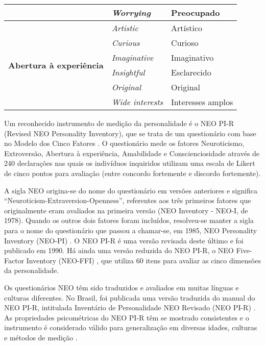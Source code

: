 \begin{table*}[ht]
\begin{tabular}{|c|l|l|}
          & \textit{Worrying} & Preocupado \\ \hline
    \multirow{6}[0]{*}{\textbf{Abertura à experiência}} & \textit{Artistic} & Artístico \\
          & \textit{Curious} & Curioso \\
          & \textit{Imaginative} & Imaginativo \\
          & \textit{Insightful} & Esclarecido \\
          & \textit{Original} & Original \\
          & \textit{Wide interests} & Interesses amplos \\
    \hline %
    \end{tabular}%
		\label{tab:adjetivos}
\end{table*}


Um reconhecido instrumento de medição da personalidade é o NEO PI-R (Revised NEO Personality Inventory), que se trata de um questionário com base no Modelo dos Cinco Fatores \cite{costa:92a}. O questionário mede os fatores Neuroticismo, Extroversão, Abertura à experiência, Amabilidade e Conscienciosidade através de 240 declarações nas quais os indivíduos inquiridos utilizam uma escala de Likert de cinco pontos para avaliação (entre concordo fortemente e discordo fortemente).

A sigla NEO origina-se do nome do questionário em versões anteriores e significa ``Neuroticism-Extraversion-Openness'', referentes aos três primeiros fatores que originalmente eram avaliados na primeira versão (NEO Inventory - NEO-I, de 1978). Quando os outros dois fatores foram incluídos, resolveu-se manter a sigla para o nome do questionário que passou a chamar-se, em 1985, NEO Personality Inventory (NEO-PI) \cite{costa:85}. O NEO PI-R é uma versão revisada deste último e foi publicado em 1990. Há ainda uma versão reduzida do NEO PI-R, o NEO Five-Factor Inventory (NEO-FFI) \cite{costa:92b}, que utiliza 60 itens para avaliar as cinco dimensões da personalidade.

Os questionários NEO têm sido traduzidos e avaliados em muitas línguas e culturas diferentes. No Brasil, foi publicada uma versão traduzida do manual do NEO PI-R, intitulada Inventário de Personalidade NEO Revisado (NEO PI-R) \cite{flores:07}. As propriedades psicométricas do NEO PI-R têm se mostrado consistentes e o instrumento é considerado válido para generalização em diversas idades, culturas e métodos de medição \cite{mccrae:11}.

